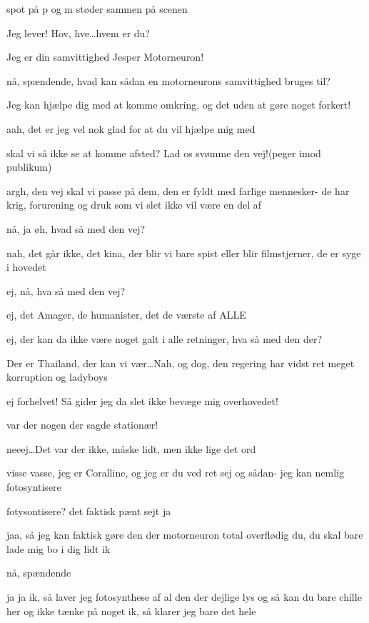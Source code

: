 \documentclass[a4paper,11pt]{article}
\begin{document}
\begin{sketch}


\scene spot på p og m støder sammen på scenen

 Jeg lever! Hov, hve\ldots hvem er du?

 Jeg er din samvittighed Jesper Motorneuron!

 nå, spændende, hvad kan sådan en motorneurons samvittighed bruges til?

 Jeg kan hjælpe dig med at komme omkring, og det uden at gøre noget forkert! 

 aah, det er jeg vel nok glad for at du vil hjælpe mig med

 skal vi så ikke se at komme afsted? Lad os svømme den vej!(peger imod publikum)

 argh, den vej skal vi passe på dem, den er fyldt med farlige mennesker- de har krig, forurening og druk som vi slet ikke vil være en del af

 nå, ja øh, hvad så med den vej?

 nah, det går ikke, det kina, der blir vi bare spist eller blir filmstjerner, de er syge i hovedet

 ej, nå, hva så med den vej?

 ej, det Amager, de humanister, det de værste af ALLE

 ej, der kan da ikke være noget galt i alle retninger, hva så med den der? 

 Der er Thailand, der kan vi vær\ldots Nah, og dog, den regering har vidst ret meget korruption og ladyboys

 ej forhelvet! Så gider jeg da slet ikke bevæge mig overhovedet!

 var der nogen der sagde stationær!

 neeej\ldots Det var der ikke, måske lidt, men ikke lige det ord

 visse vasse, jeg er Coralline, og jeg er du ved ret sej og sådan- jeg kan nemlig fotosyntisere 

 fotysontisere? det faktisk pænt sejt ja

 jaa, så jeg kan faktisk gøre den der motorneuron total overflødig du, du skal bare lade mig bo i dig lidt ik

 nå, spændende 

 ja ja ik, så laver jeg fotosynthese af al den der dejlige lys og så kan du bare chille her og ikke tænke på noget ik, så klarer jeg bare det hele


\end{sketch}
\end{document}
